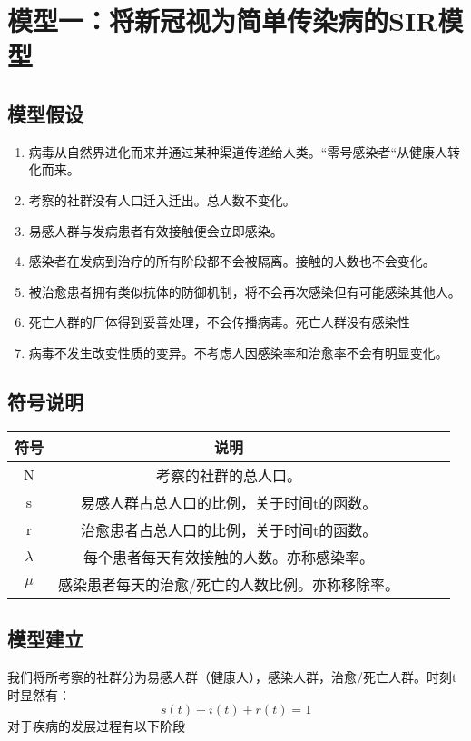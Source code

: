 \documentclass[withoutpreface,bwprint]{cumcmthesis} %
\begin{document}
\section{模型一：将新冠视为简单传染病的SIR模型}
\subsection{模型假设}
\begin{enumerate}
    \item 病毒从自然界进化而来并通过某种渠道传递给人类。“零号感染者“从健康人转化而来。
    \item 考察的社群没有人口迁入迁出。总人数不变化。
    \item 易感人群与发病患者有效接触便会立即感染。
    \item 感染者在发病到治疗的所有阶段都不会被隔离。接触的人数也不会变化。
    \item 被治愈患者拥有类似抗体的防御机制，将不会再次感染但有可能感染其他人。\cite{ref1}
    \item 死亡人群的尸体得到妥善处理，不会传播病毒。死亡人群没有感染性
    \item 病毒不发生改变性质的变异。不考虑人因感染率和治愈率不会有明显变化。
\end{enumerate}
\subsection{符号说明}
   \begin{table}[!htbp]
   \label{tab:001} \centering
    \begin{tabular}{ccccc}
        \toprule[1.5pt]
        符号 & 说明 \\
        \midrule[1pt]
         N& 考察的社群的总人口。\\
         s& 易感人群占总人口的比例，关于时间t的函数。\\
         r& 治愈患者占总人口的比例，关于时间t的函数。\\
         $\lambda$ & 每个患者每天有效接触的人数。亦称感染率。\\
         $\mu$ & 感染患者每天的治愈/死亡的人数比例。亦称移除率。\\
        \bottomrule[1.5pt]
    \end{tabular}
\end{table}

\subsection{模型建立}
我们将所考察的社群分为易感人群（健康人），感染人群，治愈/死亡人群。时刻t时显然有：
    \begin{equation}\label{qua:001}
      s(t)+i(t)+r(t)=1
    \end{equation}
对于疾病的发展过程有以下阶段
\end{document}
